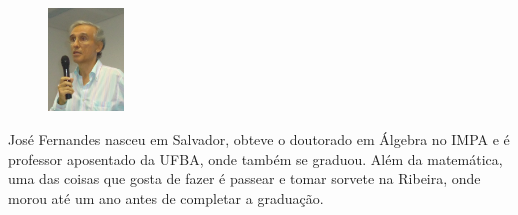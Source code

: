 \documentclass{hipatia}
\begin{document}
\vfill
\begin{figure}
\vspace{-10pt}
  \includegraphics[width=2cm]{fotobio.png}
\end{figure}\noindent
José Fernandes nasceu em  Salvador, obteve o doutorado
em Álgebra no IMPA e é professor aposentado da UFBA, 
onde também se graduou. 
Além da matemática, uma das coisas que gosta de fazer é
passear e tomar sorvete na Ribeira, onde morou até um 
ano antes de completar a graduação.
\end{document}
